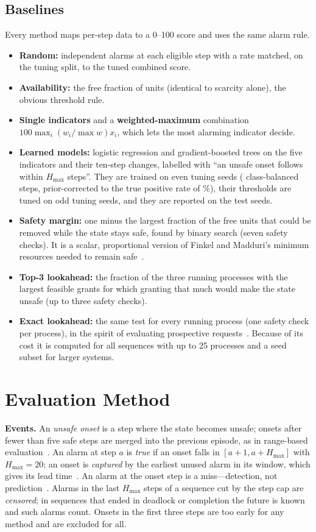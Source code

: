 \documentclass[conference]{IEEEtran}
\begin{document}
\subsection{Baselines}
Every method maps per-step data to a 0--100 score and uses the same alarm rule.
\begin{itemize}
\item \textbf{Random:} independent alarms at each eligible step with a rate matched, on the tuning split, to the tuned combined score.
\item \textbf{Availability:} the free fraction of units (identical to scarcity alone), the obvious threshold rule.
\item \textbf{Single indicators} and a \textbf{weighted-maximum} combination $100\max_i(w_i/\max w)x_i$, which lets the most alarming indicator decide.
\item \textbf{Learned models:} logistic regression and gradient-boosted trees on the five indicators and their ten-step changes, labelled with ``an unsafe onset follows within $H_{\max}$ steps''. They are trained on even tuning seeds (\MlRows{} class-balanced steps, prior-corrected to the true positive rate of \MlPrior\%), their thresholds are tuned on odd tuning seeds, and they are reported on the test seeds.
\item \textbf{Safety margin:} one minus the largest fraction of the free units that could be removed while the state stays safe, found by binary search (seven safety checks). It is a scalar, proportional version of Finkel and Madduri's minimum resources needed to remain safe~\cite{Finkel1987}.
\item \textbf{Top-3 lookahead:} the fraction of the three running processes with the largest feasible grants for which granting that much would make the state unsafe (up to three safety checks).
\item \textbf{Exact lookahead:} the same test for every running process (one safety check per process), in the spirit of evaluating prospective requests~\cite{AndrewsLevin1982}. Because of its cost it is computed for all sequences with up to 25 processes and a seed subset for larger systems.
\end{itemize}

\section{Evaluation Method}
\textbf{Events.} An \emph{unsafe onset} is a step where the state becomes unsafe; onsets after fewer than five safe steps are merged into the previous episode, as in range-based evaluation~\cite{Tatbul2018}. An alarm at step $a$ is \emph{true} if an onset falls in $[a{+}1,a{+}H_{\max}]$ with $H_{\max}=20$; an onset is \emph{captured} by the earliest unused alarm in its window, which gives its lead time~\cite{Hyland2020}. An alarm at the onset step is a miss---detection, not prediction~\cite{Munchmeyer2021}. Alarms in the last $H_{\max}$ steps of a sequence cut by the step cap are \emph{censored}; in sequences that ended in deadlock or completion the future is known and such alarms count. Onsets in the first three steps are too early for any method and are excluded for all.
\end{document}
